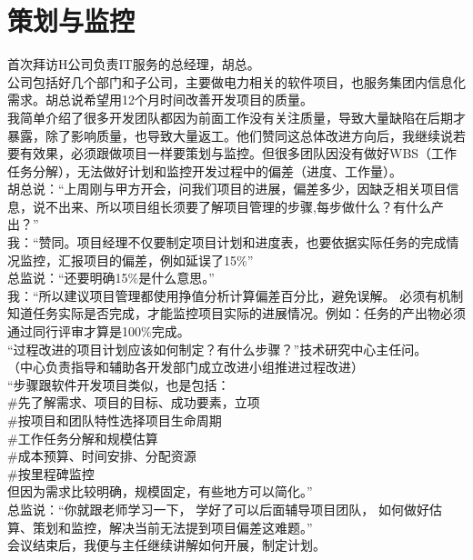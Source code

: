 \chapter{策划与监控} %


首次拜访H公司负责IT服务的总经理，胡总。\\
公司包括好几个部门和子公司，主要做电力相关的软件项目，也服务集团内信息化需求。胡总说希望用12个月时间改善开发项目的质量。\\
我简单介绍了很多开发团队都因为前面工作没有关注质量，导致大量缺陷在后期才暴露，除了影响质量，也导致大量返工。他们赞同这总体改进方向后，我继续说若要有效果，必须跟做项目一样要策划与监控。但很多团队因没有做好WBS（工作任务分解），无法做好计划和监控开发过程中的偏差（进度、工作量）。\\
胡总说：``上周刚与甲方开会，问我们项目的进展，偏差多少，因缺乏相关项目信息，说不出来、所以项目组长须要了解项目管理的步骤,每步做什么？有什么产出？''\\
我：``赞同。项目经理不仅要制定项目计划和进度表，也要依据实际任务的完成情况监控，汇报项目的偏差，例如延误了15\%''\\
总监说：``还要明确15\%是什么意思。''\\
我：``所以建议项目管理都使用挣值分析计算偏差百分比，避免误解。
必须有机制知道任务实际是否完成，才能监控项目实际的进展情况。例如：任务的产出物必须通过同行评审才算是100\%完成。\\
``过程改进的项目计划应该如何制定？有什么步骤？''技术研究中心主任问。\\
（中心负责指导和辅助各开发部门成立改进小组推进过程改进）\\
``步骤跟软件开发项目类似，也是包括：\\
\#先了解需求、项目的目标、成功要素，立项\\
\#按项目和团队特性选择项目生命周期\\
\#工作任务分解和规模估算\\
\#成本预算、时间安排、分配资源\\
\#按里程碑监控\\
但因为需求比较明确，规模固定，有些地方可以简化。''\\
总监说：``你就跟老师学习一下， 学好了可以后面辅导项目团队，
如何做好估算、策划和监控，解决当前无法提到项目偏差这难题。''\\
会议结束后，我便与主任继续讲解如何开展，制定计划。

\begin{description}
\item[]
\begin{description}
\tightlist
\item[]
= = = = = = = = = =
\end{description}
\end{description}

